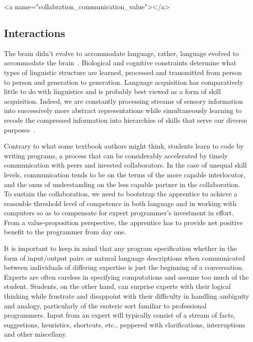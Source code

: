 
\rawhtml
<a name="collabration_communication_value"></a>
\endrawhtml
\subsection*{Interactions}


The brain didn't evolve to accommodate language, rather, language evolved to accommodate the brain~\cite{ChaterandChristiansenHLB-11}. Biological and cognitive constraints determine what types of linguistic structure are learned, processed and transmitted from person to person and generation to generation. Language acquisition has comparatively little to do with linguistics and is probably best viewed as a form of skill acquisition. Indeed, we are constantly processing streams of sensory information into successively more abstract representations while simultaneously learning to recode the compressed information into hierarchies of skills that serve our diverse purposes~\cite{ChaterandChristiansenCOiBS-18,ChateretalJML-16}.

Contrary to what some textbook authors might think, students learn to code by writing programs, a process that can be considerably accelerated by timely communication with peers and invested collaborators. In the case of unequal skill levels, communication tends to be on the terms of the more capable interlocutor, and the onus of understanding on the less capable partner in the collaboration. To sustain the collaboration, we need to bootstrap the apprentice to achieve a reasonble threshold level of competence in both language and in working with computers so as to compensate for expert programmer's investment in effort. From a value-proposition perspective, the apprentice has to provide net positive benefit to the programmer from day one.

It is important to keep in mind that any program specification whether in the form of input/output pairs or natural language descriptions when communicated between individuals of differing expertise is just the beginning of a conversation. Experts are often careless in specifying computations and assume too much of the student. Students, on the other hand, can surprise experts with their logical thinking while frustrate and disappoint with their difficulty in handling ambiguity and analogy, particularly of the esoteric sort familiar to professional programmers. Input from an expert will typically consist of a stream of facts, suggestions, heuristics, shortcuts, etc., peppered with clarifications, interruptions and other miscellany.

